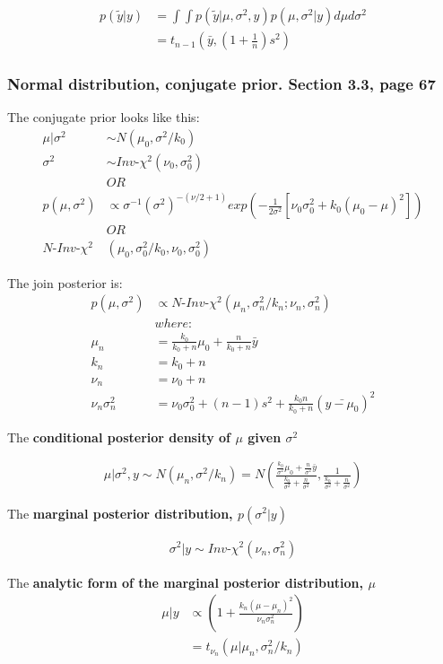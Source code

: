 \documentclass[]{article}
\begin{document}
$$
\begin{aligned}
	p(\tilde{y}|y) &= \int \int p(\tilde{y}|\mu, \sigma^2, y)p(\mu, \sigma^2 | y)d\mu d\sigma^2\\
	 &=t_{n-1}\left(\bar{y}, \left(1+\frac{1}{n}\right)s^2\right)
\end{aligned}
$$



\subsubsection{Normal distribution, conjugate prior. Section 3.3, page 67}
The conjugate prior looks like this:
$$
\begin{aligned}
	\mu|\sigma^2 &\sim N(\mu_0, \sigma^2/k_0)\\
	     \sigma^2 &\sim Inv\mbox{-}\chi^2(\nu_0, \sigma_0^2)\\
			&OR\\
			p(\mu, \sigma^2) &\propto \sigma^{-1}(\sigma^2)^{-(\nu/2 + 1)}exp\left( -\frac{1}{2\sigma^2}\left[\nu_0\sigma_0^2 + k_0(\mu_0 - \mu)^2 \right]  \right)\\
			&OR\\
	N \mbox{-} Inv \mbox{-} \chi^2&(\mu_0, \sigma_0^2/k_0, \nu_0, \sigma_0^2)
\end{aligned}
$$

The join posterior is:
$$
\begin{aligned}
			p(\mu, \sigma^2) &\propto N \mbox{-} Inv \mbox{-} \chi^2(\mu_n, \sigma_n^2/k_n; \nu_n, \sigma_n^2)\\
			&where:\\
			\mu_n &= \frac{k_0}{k_0 + n}\mu_0  +  \frac{n}{k_0 + n}\bar{y}\\
			k_n   &= k_0 + n\\
			\nu_n &= \nu_0 + n\\
			\nu_n \sigma_n^2 &= \nu_0 \sigma_0^2 + (n-1)s^2 + \frac{k_0n}{k_0 + n}(\bar{y - \mu_0})^2
\end{aligned}
$$

The \textbf{conditional posterior density of $\mu$ given $\sigma^2$}

$$
\begin{aligned}
			\mu|\sigma^2,y \sim N\left(  \mu_n, \sigma^2/k_n \right) = N\left( \frac{ \frac{k_0}{\sigma^2}\mu_0 +  \frac{n}{\sigma^2}\bar{y} }{  \frac{k_0}{\sigma^2} +  \frac{n}{\sigma^2}  },  \frac{1 }{  \frac{k_0}{\sigma^2} +  \frac{n}{\sigma^2}  }  \right)
\end{aligned}
$$

The \textbf{marginal posterior distribution, $p(\sigma^2|y)$}

$$
\begin{aligned}
			\sigma^2|y \sim  Inv\mbox{-}\chi^2 \left(\nu_n, \sigma_n^2  \right)
\end{aligned}
$$


The \textbf{analytic form of the marginal posterior distribution, $\mu$}
$$
\begin{aligned}
			\mu|y &\propto  \left( 1+ \frac{k_n(\mu - \mu_n)^2}{  \nu_n\sigma_n^2  }  \right) \\
			       &=t_{\nu_n}  \left(  \mu|\mu_n, \sigma_n^2/k_n   \right)
\end{aligned}
$$
\end{document}
